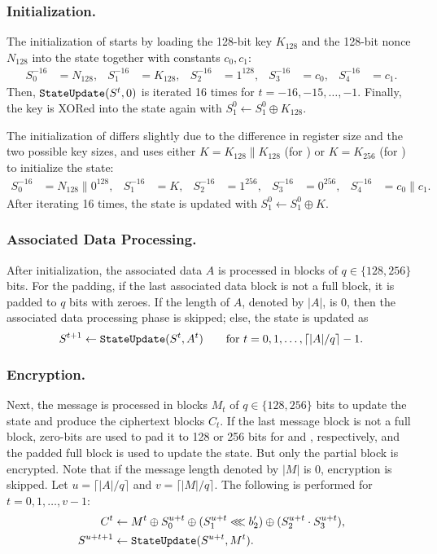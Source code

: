 \subsubsection{Initialization.}
The initialization of \MORUS[640] starts by loading the 128-bit key $K_{128}$ and the 128-bit nonce $N_{128}$ into the state together with constants $c_0, c_1$:
\begin{align*}
S^{-16}_0 &= N_{128}, &
S^{-16}_1 &= K_{128}, &
S^{-16}_2 &= 1^{128}, &
S^{-16}_3 &= c_0, &
S^{-16}_4 &= c_1.
\end{align*}
Then, $\texttt{StateUpdate}{}(S^t,0)$ is iterated 16 times for $t=-16,-15,\ldots,-1$.
Finally, the key is XORed into the state again with $S^0_1 \leftarrow S^0_1 \oplus K_{128}$.

The initialization of \MORUS[1280] differs slightly due to the difference in register size and the two possible key sizes,
and uses either
$K = K_{128} \|K_{128}$ (for \MORUS[1280-128]) or
$K = K_{256}$ (for \MORUS[1280-256])
to initialize the state:
\begin{align*}
S^{-16}_0 &= N_{128} \mathrel\| 0^{128}, &
S^{-16}_1 &= K, &
S^{-16}_2 &= 1^{256}, &
S^{-16}_3 &= 0^{256}, &
S^{-16}_4 &= c_0\mathrel\|c_1.
\end{align*}
After iterating \StateUpdate{} 16 times, the state is updated with $S^0_1 \leftarrow S^0_1 \oplus K$.


\subsubsection{Associated Data Processing.}
After initialization, the associated data $A$ is processed in blocks of $q \in \{128, 256\}$ bits.
For the padding, if the last associated data block is not a full block, it is padded to $q$ bits with zeroes.
If the length of $A$, denoted by $|A|$, is 0, then the associated data processing phase is skipped;
else, the state is updated as
\[S^{t+1} \leftarrow \texttt{StateUpdate}{}(S^t, A^t) \qquad \text{for } t=0,1,\ldots,\lceil |A|/q\rceil-1.\]

\subsubsection{Encryption.}
Next, the message is processed in blocks $M_t$ of  $q \in \{128, 256\}$ bits to update the state and produce the ciphertext blocks $C_t$.
If the last message block is not a full block, zero-bits are used to pad it to 128 or 256 bits for \MORUS[640] and \MORUS[1280], respectively, and the padded full block is used to update the state. But only the partial block is encrypted. Note that if the message length denoted by $|M|$ is 0, encryption is skipped.
Let $u = \lceil |A|/q \rceil$ and $v = \lceil |M|/q \rceil$. The following is performed for $t=0, 1, \ldots, v-1$:
\begin{align*}
C^t &\leftarrow M^t \oplus S^{u+t}_0 \oplus (S^{u+t}_1 \lll b_2') \oplus (S^{u+t}_2 \cdot S^{u+t}_3),\\
S^{u+t+1} &\leftarrow \texttt{StateUpdate}{}(S^{u+t},M^t).
\end{align*}

